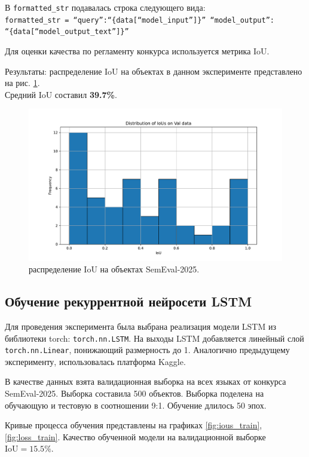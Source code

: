\documentclass[12pt]{article}
\begin{document}
В \texttt{formatted\_str} подавалась строка следующего вида:\\
\texttt{formatted\_str = ``query'':``\{data[``model\_input'']\}'' ``model\_output'':\\``\{data[``model\_output\_text'']\}''}

Для оценки качества по регламенту конкурса используется метрика IoU. 

Результаты: распределение IoU на объектах в данном эксперименте представлено на рис. \ref{fig:ious_histogram}.\\ Средний IoU составил \textbf{39.7\%}.

\begin{figure}[h]
    \centering
    \includegraphics[width=\textwidth]{images/ious_histogram.pdf}
    \caption{распределение IoU на объектах SemEval-2025.}
    \label{fig:ious_histogram}
\end{figure}

\subsection{Обучение рекуррентной нейросети LSTM}
Для проведения эксперимента была выбрана реализация модели LSTM из библиотеки torch: \texttt{torch.nn.LSTM}. На выходы LSTM добавляется линейный слой \texttt{torch.nn.Linear}, понижающий размерность до 1. Аналогично предыдущему эксперименту, использовалась платформа Kaggle. 

В качестве данных взята валидационная выборка на всех языках от конкурса SemEval-2025. Выборка составила 500 объектов. Выборка поделена на обучающую и тестовую в соотношении 9:1. Обучение длилось 50 эпох. 

Кривые процесса обучения представлены на графиках \ref{fig:ious_train}, \ref{fig:loss_train}. Качество обученной модели на валидационной выборке  $\text{IoU}=15.5\%$.
\end{document}
